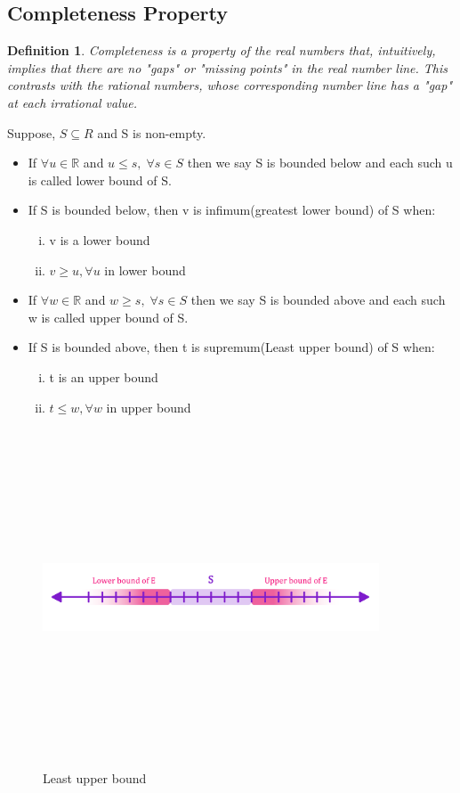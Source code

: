 \documentclass{article}
\newtheorem{definition}{Definition}[section]
\begin{document}
\subsection{Completeness Property}
\begin{definition}
    Completeness is a property of the real numbers that, intuitively, implies that there are no "gaps" or "missing points" in the real number line. This contrasts with the rational numbers, whose corresponding number line has a "gap" at each irrational value.
\end{definition}   
    Suppose, $S\subseteq R$ and S is non-empty. 
    \begin{itemize}
        \item If $\forall u \in \mathbb{R}$ and $u\leq s,\; \forall s \in S$ then we say S is bounded below and each such u is called lower bound of S.\\
        \item If S is bounded below, then v is infimum(greatest lower bound) of S when:
            \begin{enumerate}[i.]
                \item v is a lower bound
                \item $v \geq u, \forall u$ in lower bound
            \end{enumerate}
        \item If $\forall w \in \mathbb{R}$ and $w\geq s,\; \forall s \in S$ then we say S is bounded above and each such w is called upper bound of S.\\
        \item If S is bounded above, then t is supremum(Least upper bound) of S when:
            \begin{enumerate}[i.]
                \item t is an upper bound
                \item $t \leq w, \forall w$ in upper bound
            \end{enumerate}
    \end{itemize}
\begin{figure}[H]
    \centering
    \includegraphics [width=10cm,height=10cm,keepaspectratio]{tex graphs-11.png}
    \caption{Least upper bound}
\end{figure}
\end{document}
